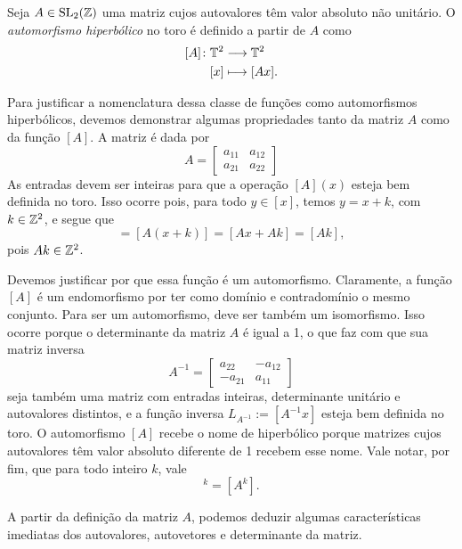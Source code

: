 \begin{definition}
Seja $A \in \operatorname{SL}_2(\mathbb{Z})$ uma matriz cujos autovalores têm valor absoluto não unitário. O \textit{automorfismo hiperbólico} no toro é definido a partir de $A$ como
	\begin{align*}
	{[A]}\colon {\mathbb{T}^2} &\longrightarrow {\mathbb{T}^2} \\{[x]} &\longmapsto [Ax].
	\end{align*}
\end{definition}

Para justificar a nomenclatura dessa classe de funções como automorfismos hiperbólicos, devemos demonstrar algumas propriedades tanto da matriz $A$ como da função $[A]$. A matriz é dada por
	\begin{equation*}
	A = \begin{bmatrix}
		a_{11} & a_{12} \\
		a_{21} & a_{22}
		\end{bmatrix}
	\end{equation*}
As entradas devem ser inteiras para que a operação $[A](x)$ esteja bem definida no toro. Isso ocorre pois, para todo $y \in [x]$, temos $y = x + k$, com $k \in \mathbb{Z}^2$, e segue que
	\begin{equation*}
	[Ay] = [A(x+k)] = [Ax + Ak] = [Ak],
	\end{equation*}
pois $Ak \in \mathbb{Z}^2$.

Devemos justificar por que essa função é um automorfismo. Claramente, a função $[A]$ é um endomorfismo por ter como domínio e contradomínio o mesmo conjunto. Para ser um automorfismo, deve ser também um isomorfismo. Isso ocorre porque o determinante da matriz $A$ é igual a 1, o que faz com que sua matriz inversa
	\begin{equation*}
	A^{-1} = \begin{bmatrix}
		a_{22} & -a_{12} \\
		-a_{21} & a_{11}
		\end{bmatrix}
	\end{equation*}
seja também uma matriz com entradas inteiras, determinante unitário e autovalores distintos, e a função inversa $L_{A^{-1}} := [A^{-1}x]$ esteja bem definida no toro. O automorfismo $[A]$ recebe o nome de hiperbólico porque matrizes cujos autovalores têm valor absoluto diferente de 1 recebem esse nome. Vale notar, por fim, que para todo inteiro $k$, vale
	\begin{equation*}
	[A]^k = [A^k].
	\end{equation*}

A partir da definição da matriz $A$, podemos deduzir algumas características imediatas dos autovalores, autovetores e determinante da matriz.

